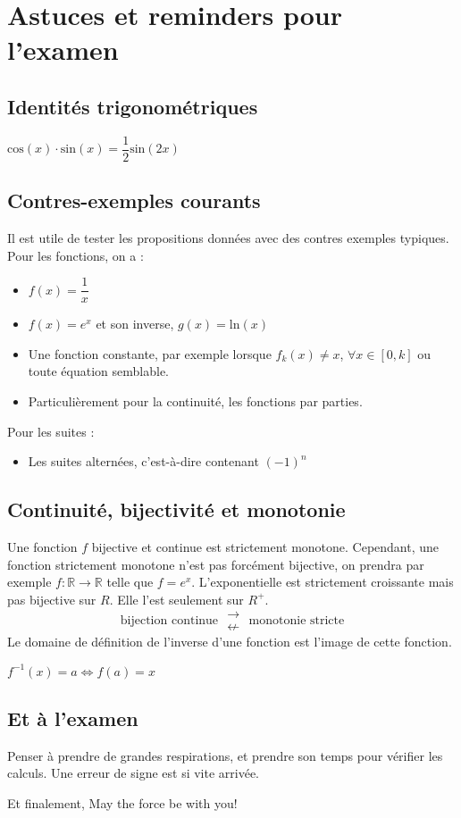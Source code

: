 \documentclass[10pt,a4paper]{book}
\newcommand{\R}{\mathbb{R}}
\begin{document}
\chapter{Astuces et reminders pour l'examen}
\section{Identités trigonométriques}
$\text{cos}(x)\cdot\text{sin}(x) = \dfrac{1}{2}\text{sin}(2x)$

\section{Contres-exemples courants}
Il est utile de tester les propositions données avec des contres exemples typiques. Pour les fonctions, on a :
\begin{itemize}
\item $f(x) = \dfrac{1}{x}$
\item $f(x) = e^x$ et son inverse, $g(x) = \text{ln}(x)$
\item Une fonction constante, par exemple lorsque $f_k(x)\neq x$, $\forall x\in [0,k]$ ou toute équation semblable.
\item Particulièrement pour la continuité, les fonctions par parties.
\end{itemize}
Pour les suites :
\begin{itemize}
\item Les suites alternées, c'est-à-dire contenant $(-1)^n$
\end{itemize}

\section{Continuité, bijectivité et monotonie}
Une fonction $f$ bijective et continue est strictement monotone. Cependant, une fonction strictement monotone n'est pas forcément bijective, on prendra par exemple
$f:\R\to\R$ telle que $f=e^x$. L'exponentielle est strictement croissante mais pas bijective sur $R$. Elle l'est seulement sur $R^+$.
\[\text{bijection continue }\begin{smallmatrix}
\rightarrow \\
\nleftarrow
\end{smallmatrix}\text{ monotonie stricte}\]
Le domaine de définition de l'inverse d'une fonction est l'image de cette fonction.\par
$f^{-1}(x) = a \Leftrightarrow f(a) = x$

\section{Et à l'examen}
Penser à prendre de grandes respirations, et prendre son temps pour vérifier les calculs. Une erreur de signe est si vite arrivée. \par 
Et finalement, {May the force be with you}!
\end{document}
